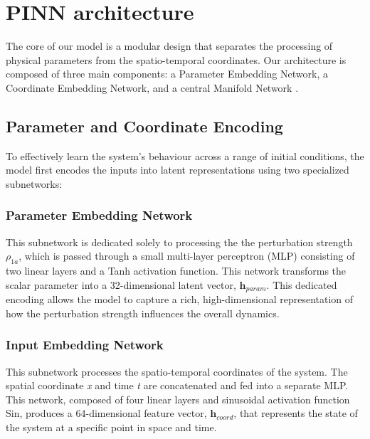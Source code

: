 \documentclass{article}
\begin{document}
\section{PINN architecture}
The core of our model is a modular design that separates the processing of physical parameters from the spatio-temporal coordinates. Our architecture is composed of three main components: a Parameter Embedding Network, a Coordinate Embedding Network, and a central Manifold Network .

\subsection{Parameter and Coordinate Encoding}

To effectively learn the system's behaviour across a range of initial conditions, the model first encodes the inputs into latent representations using two specialized subnetworks:

\subsubsection{Parameter Embedding Network}
This subnetwork is dedicated solely to processing the the perturbation strength $\rho_{1a}$, which is passed through a small multi-layer perceptron (MLP) consisting of two linear layers and a Tanh activation function. This network transforms the scalar parameter into a 32-dimensional latent vector, $\mathbf{h}_{param}$. This dedicated encoding allows the model to capture a rich, high-dimensional representation of how the perturbation strength influences the overall dynamics. 

\subsubsection{Input Embedding Network}
This subnetwork processes the spatio-temporal coordinates of the system. The spatial coordinate \textit{x} and time \textit{t} are concatenated and fed into a separate MLP. This network, composed of four linear layers and sinusoidal activation function Sin, produces a 64-dimensional feature vector, $\mathbf{h}_{coord}$, that represents the state of the system at a specific point in space and time.
\end{document}
